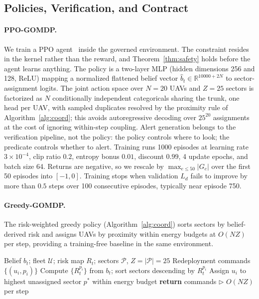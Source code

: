\documentclass[letterpaper]{article} %
\newcommand{\Rset}{\mathbb{R}}
\newcommand{\calU}{\mathcal{U}}
\begin{document}
\subsection{Policies, Verification, and Contract}
\label{sec:policies}

\paragraph{PPO-GOMDP.} We train a PPO agent~\citep{schulman2017} inside the governed environment. The constraint resides in the kernel rather than the reward, and Theorem~\ref{thm:safety} holds before the agent learns anything. The policy is a two-layer MLP (hidden dimensions 256 and 128, ReLU) mapping a normalized flattened belief vector $\hat{b}_t\in\Rset^{10000+2N}$ to sector-assignment logits. The joint action space over $N=20$ UAVs and $Z=25$ sectors is factorized as $N$ conditionally independent categoricals sharing the trunk, one head per UAV, with sampled duplicates resolved by the proximity rule of Algorithm~\ref{alg:coord}; this avoids autoregressive decoding over $25^{20}$ assignments at the cost of ignoring within-step coupling. Alert generation belongs to the verification pipeline, not the policy: the policy controls where to look; the predicate controls whether to alert. Training runs 1000 episodes at learning rate $3\times10^{-4}$, clip ratio $0.2$, entropy bonus $0.01$, discount $0.99$, 4 update epochs, and batch size 64. Returns are negative, so we rescale by $\max_{e\leq 50}|G_e|$ over the first 50 episodes into $[-1,0]$. Training stops when validation $L_d$ fails to improve by more than $0.5$ steps over 100 consecutive episodes, typically near episode 750.

\paragraph{Greedy-GOMDP.} The risk-weighted greedy policy (Algorithm~\ref{alg:coord}) sorts sectors by belief-derived risk and assigns UAVs by proximity within energy budgets at $O(NZ)$ per step, providing a training-free baseline in the same environment.

\begin{algorithm}[!t]
\caption{Risk-Weighted Greedy Coordination}
\label{alg:coord}
\begin{algorithmic}[1]
\REQUIRE Belief $b_t$; fleet $\calU$; risk map $R_t$; sectors $\mathcal{P}$, $Z=|\mathcal{P}|=25$
\ENSURE Redeployment commands $\{(u_i,p_i)\}$
\STATE Compute $\{R^{p_i}_t\}$ from $b_t$; sort sectors descending by $R^{p_i}_t$
\FOR{each $u_i\in\calU$ (sorted by proximity)}
\STATE Assign $u_i$ to highest unassigned sector $p^*$ within energy budget
\ENDFOR
\STATE \textbf{return} commands \hfill $\triangleright$ $O(NZ)$ per step
\end{algorithmic}
\end{algorithm}
\end{document}
